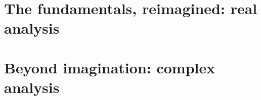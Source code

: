 \documentclass[b5paper, 11pt, openleft]{memoir}
\begin{document}
\part{The fundamentals, reimagined: real analysis}



\part{Beyond imagination: complex analysis}



\appendix




\backmatter

\printindex
\printbibliography
\end{document}
